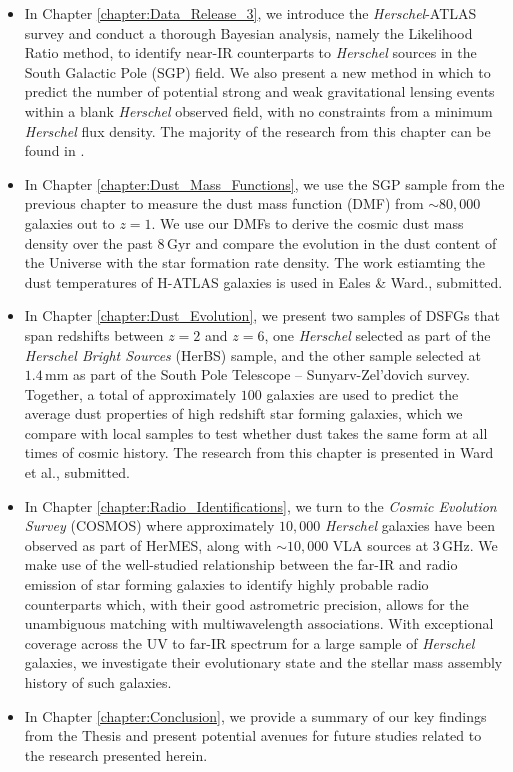 \begin{itemize}
	\item In Chapter \ref{chapter:Data_Release_3}, we introduce the \textit{Herschel}-ATLAS survey and conduct a thorough Bayesian analysis, namely the Likelihood Ratio method, to identify near-IR counterparts to \textit{Herschel} sources in the South Galactic Pole (SGP) field. We also present a new method in which to predict the number of potential strong and weak gravitational lensing events within a blank \textit{Herschel} observed field, with no constraints from a minimum \textit{Herschel} flux density. The majority of the research from this chapter can be found in \citealt{Ward_2022}.
	\item In Chapter \ref{chapter:Dust_Mass_Functions}, we use the SGP sample from the previous chapter to measure the dust mass function (DMF) from $\sim80,000$ galaxies out to $z = 1$. We use our DMFs to derive the cosmic dust mass density over the past $8\,$Gyr and compare the evolution in the dust content of the Universe with the star formation rate density. The work estiamting the dust temperatures of H-ATLAS galaxies is used in Eales \& Ward., submitted.
	\item In Chapter \ref{chapter:Dust_Evolution}, we present two samples of DSFGs that span redshifts between $z=2$ and $z=6$, one \textit{Herschel} selected as part of the \textit{Herschel Bright Sources} (HerBS) sample, and the other sample selected at $1.4\,$mm as part of the South Pole Telescope -- Sunyarv-Zel'dovich survey. Together, a total of approximately $100$ galaxies are used to predict the average dust properties of high redshift star forming galaxies, which we compare with local samples to test whether dust takes the same form at all times of cosmic history. The research from this chapter is presented in Ward et al., submitted.
	\item In Chapter \ref{chapter:Radio_Identifications}, we turn to the \textit{Cosmic Evolution Survey} (COSMOS) where approximately $10,000$ \textit{Herschel} galaxies have been observed as part of HerMES, along with $\sim10,000$ VLA sources at $3\,$GHz. We make use of the well-studied relationship between the far-IR and radio emission of star forming galaxies to identify highly probable radio counterparts which, with their good astrometric precision, allows for the unambiguous matching with multiwavelength associations. With exceptional coverage across the UV to far-IR spectrum for a large sample of \textit{Herschel} galaxies, we investigate their evolutionary state and the stellar mass assembly history of such galaxies.
	\item In Chapter \ref{chapter:Conclusion}, we provide a summary of our key findings from the Thesis and present potential avenues for future studies related to the research presented herein.
\end{itemize}
